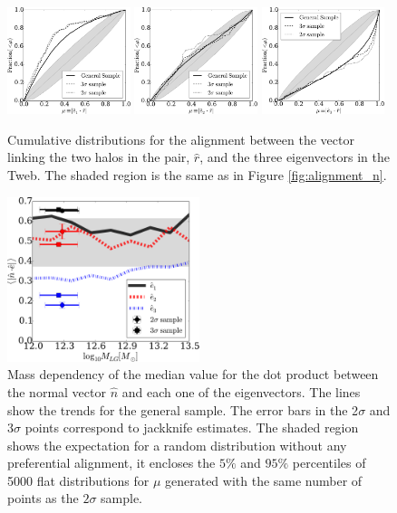 \documentclass{emulateapj}
\begin{document}
\begin{figure}
\begin{center}
  \includegraphics[width=0.32\textwidth]{fig4a.pdf}
  \includegraphics[width=0.32\textwidth]{fig4b.pdf}
  \includegraphics[width=0.32\textwidth]{fig4c.pdf}
\end{center}
\caption{Cumulative distributions for the alignment between the vector
  linking the two halos in the pair, $\hat{r}$, and the three
  eigenvectors in the Tweb. The shaded region is the same as in
  Figure \ref{fig:alignment_n}.
    \label{fig:alignment_r}}  
\end{figure}


\begin{figure}
\begin{center}
  \includegraphics[width=0.50\textwidth]{fig5.pdf}
\caption{Mass dependency of the median value for the dot product
  between the normal vector $\hat{n}$ and each one of the
  eigenvectors.  The lines show the trends for the general sample.
The error bars in the 2$\sigma$ and 3$\sigma$ points
  correspond to jackknife estimates. 
 The shaded region shows the expectation for a random distribution
 without any preferential alignment, it encloses the $5\%$ and $95\%$
 percentiles of 5000  flat distributions for $\mu$ generated with the
 same number of points as the $2\sigma$ sample.   
\label{fig:median_alignment_n}}
\end{center}
\end{figure}
\end{document}
